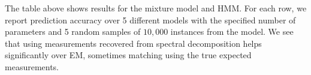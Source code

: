 
The table above shows results for the mixture model and HMM.
For each row, we report prediction accuracy
over 5 different models with the specified number of parameters and 5 random
samples of $10,000$ instances from the model. 
We see that using measurements recovered from spectral decomposition
helps significantly over EM, sometimes matching
using the true expected measurements.


